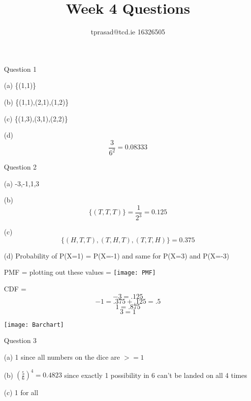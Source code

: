 \documentclass[12pt]{article}
\title{Week 4 Questions}
\author{tprasad@tcd.ie 16326505}
\begin{document}
\maketitle
\begin{flushleft}
Question 1

	(a) \{(1,1)\}
	
	(b)	\{(1,1),(2,1),(1,2)\}
	
	(c)	\{(1,3),(3,1),(2,2)\}
	
	(d) \[ \frac{3}{6^2} = 0.08333 \]
	
Question 2

	(a)	-3,-1,1,3
	
	(b) \[ \{(T,T,T)\} = \frac{1}{2^3} = 0.125 \]
	
	(c) \[\{(H,T,T),(T,H,T),(T,T,H)\} = 0.375\]
	
	(d)	Probability of P(X=1) = P(X=-1) and same for P(X=3) and 	P(X=-3)
	
	PMF = plotting out these values =
\texttt{[image: PMF]}

	CDF =
		\[ -3 = .125 \]
		\[ -1 = .375 + .125 = .5\]
		\[ 1 = .875 \]
		\[ 3 = 1 \]
		
\texttt{[image: Barchart]}
		
	
		
Question 3

	(a) 1 since all numbers on the dice are $>= 1$
	
	(b) $ \left(\frac{5}{6}\right)^4 = 0.4823$ since exactly 1 possibility in 6 can't be landed on all 4 times
	
	(c)	1 for all 

	
\end{flushleft}
\end{document}
